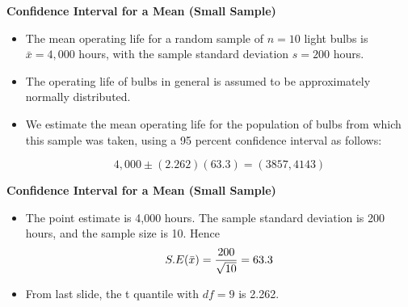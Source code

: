 \documentclass[a4paper,12pt]{article}
\begin{document}
\textbf{Confidence Interval for a Mean (Small Sample)}
\begin{itemize}
\item  The mean operating life for a random sample of $n = 10$ light bulbs is $\bar{x} = 4,000$ hours, with the sample
standard deviation $s = 200$ hours. \item  The operating life of bulbs in general is assumed to be approximately normally distributed.\item 
We estimate the mean operating life for the population of bulbs from which this sample was taken, using a 95 percent
confidence interval as follows:

\[4,000\pm(2.262)(63.3)  = (3857,4143)\]
\end{itemize}




\textbf{Confidence Interval for a Mean (Small Sample)}
\begin{itemize}
\item  The point estimate is 4,000 hours. The sample standard deviation is 200 hours, and the sample size is 10. Hence \[S.E(\bar{x} ) = { 200 \over \sqrt{10}} = 63.3\]

\item  From last slide, the t quantile with $df=9$ is 2.262.
\end{itemize}
\end{document}
